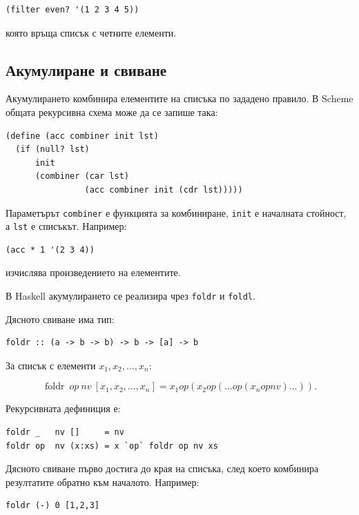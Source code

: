 \begin{verbatim}
(filter even? '(1 2 3 4 5))
\end{verbatim}

която връща списък с четните елементи.

\subsection{Акумулиране и свиване}\label{s:20.4.4}

Акумулирането комбинира елементите на списъка по зададено правило. В Scheme общата рекурсивна схема може да се запише така:

\begin{verbatim}
(define (acc combiner init lst)
  (if (null? lst)
      init
      (combiner (car lst)
                (acc combiner init (cdr lst)))))
\end{verbatim}

Параметърът \texttt{combiner} е функцията за комбиниране, \texttt{init} е началната стойност, а \texttt{lst} е списъкът. Например:

\begin{verbatim}
(acc * 1 '(2 3 4))
\end{verbatim}

изчислява произведението на елементите.

В Haskell акумулирането се реализира чрез \texttt{foldr} и \texttt{foldl}.

Дясното свиване има тип:

\begin{verbatim}
foldr :: (a -> b -> b) -> b -> [a] -> b
\end{verbatim}

За списък с елементи $x_1,x_2,\ldots,x_n$:

\[
\operatorname{foldr}\ op\ nv\ [x_1,x_2,\ldots,x_n]
=
x_1\mathbin{op}(x_2\mathbin{op}(\ldots
\mathbin{op}(x_n\mathbin{op}nv)\ldots)).
\]

Рекурсивната дефиниция е:

\begin{verbatim}
foldr _   nv []     = nv
foldr op  nv (x:xs) = x `op` foldr op nv xs
\end{verbatim}

Дясното свиване първо достига до края на списъка, след което комбинира резултатите обратно към началото. Например:

\begin{verbatim}
foldr (-) 0 [1,2,3]
\end{verbatim}

